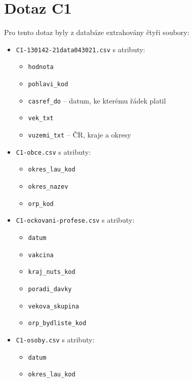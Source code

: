 \documentclass[12pt]{article}
\begin{document}
\section{Dotaz C1}
Pro tento dotaz byly z databáze extrahovány čtyři soubory:
\begin{itemize}
    \item \texttt{C1-130142-21data043021.csv} s atributy:
        \begin{itemize}
            \item \texttt{hodnota}
            \item \texttt{pohlavi\_kod}
            \item \texttt{casref\_do} -- datum, ke kterému řádek platil
            \item \texttt{vek\_txt}
            \item \texttt{vuzemi\_txt} -- ČR, kraje a okresy
        \end{itemize}
    \item \texttt{C1-obce.csv} s atributy:
        \begin{itemize}
            \item \texttt{okres\_lau\_kod}
            \item \texttt{okres\_nazev}
            \item \texttt{orp\_kod}
        \end{itemize}
    \item \texttt{C1-ockovani-profese.csv} s atributy:
        \begin{itemize}
            \item \texttt{datum}
            \item \texttt{vakcina}
            \item \texttt{kraj\_nuts\_kod}
            \item \texttt{poradi\_davky}
            \item \texttt{vekova\_skupina}
            \item \texttt{orp\_bydliste\_kod}
        \end{itemize}
    \item \texttt{C1-osoby.csv} s atributy:
        \begin{itemize}
            \item \texttt{datum}
            \item \texttt{okres\_lau\_kod}
        \end{itemize}
\end{itemize}
\end{document}
